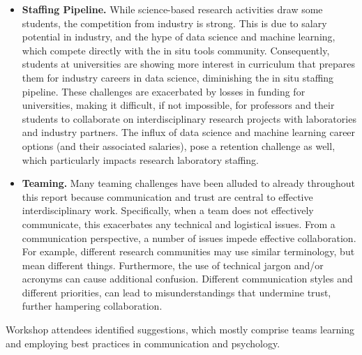 \begin{itemize}
    \item \textbf{\sffamily Staffing Pipeline.} While science-based research activities draw some students, the competition from industry is strong.  This is due to salary potential in industry, and the hype of data science and machine learning, which compete directly with the in situ tools community.  Consequently, students at universities are showing more interest in curriculum that prepares them for industry careers in data science, diminishing the in situ staffing pipeline. These challenges are exacerbated by losses in funding for universities, making it difficult, if not impossible, for professors and their students to collaborate on interdisciplinary research projects with laboratories and industry partners.  The influx of data science and machine learning career options (and their associated salaries), pose a retention challenge as well, which particularly impacts  research laboratory staffing.
    \item \textbf{\sffamily Teaming.} Many teaming challenges have been alluded to already throughout this report because communication and trust are central to effective interdisciplinary work. Specifically, when a team does not effectively communicate, this exacerbates any technical and logistical issues.  From a communication perspective, a number of issues impede effective collaboration.  For example, different research communities may use similar terminology, but mean different things.  Furthermore, the use of technical jargon and/or acronyms can cause additional confusion. Different communication styles and different priorities,  can lead to misunderstandings that undermine trust, further hampering collaboration.
\end{itemize}

  Workshop attendees identified suggestions, which mostly comprise teams learning and employing best practices in communication and psychology.
  
